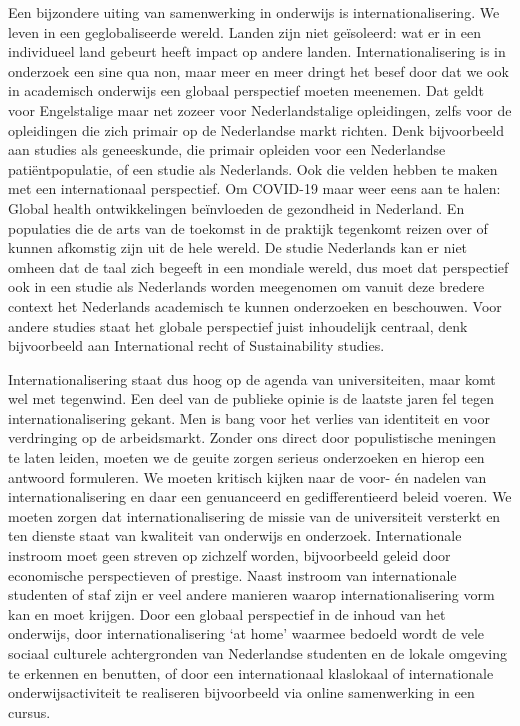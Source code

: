 \documentclass{jote-book}
\begin{document}
	Een bijzondere uiting van samenwerking in onderwijs is internationalisering. We leven in een geglobaliseerde wereld. Landen zijn niet geïsoleerd: wat er in een individueel land gebeurt heeft impact op andere landen. Internationalisering is in onderzoek een sine qua non, maar meer en meer dringt het besef door dat we ook in academisch onderwijs een globaal perspectief moeten meenemen. Dat geldt voor Engelstalige maar net zozeer voor Nederlandstalige opleidingen, zelfs voor de opleidingen die zich primair op de Nederlandse markt richten. Denk bijvoorbeeld aan studies als geneeskunde, die primair opleiden voor een Nederlandse patiëntpopulatie, of een studie als Nederlands. Ook die velden hebben te maken met een internationaal perspectief. Om COVID-19 maar weer eens aan te halen: Global health ontwikkelingen beïnvloeden de gezondheid in Nederland. En populaties die de arts van de toekomst in de praktijk tegenkomt reizen over of kunnen afkomstig zijn uit de hele wereld. De studie Nederlands kan er niet omheen dat de taal zich begeeft in een mondiale wereld, dus moet dat perspectief ook in een studie als Nederlands worden meegenomen om vanuit deze bredere context het Nederlands academisch te kunnen onderzoeken en beschouwen. Voor andere studies staat het globale perspectief juist inhoudelijk centraal, denk bijvoorbeeld aan International recht of Sustainability studies.



	Internationalisering staat dus hoog op de agenda van universiteiten, maar komt wel met tegenwind. Een deel van de publieke opinie is de laatste jaren fel tegen internationalisering gekant. Men is bang voor het verlies van identiteit en voor verdringing op de arbeidsmarkt. Zonder ons direct door populistische meningen te laten leiden, moeten we de geuite zorgen serieus onderzoeken en hierop een antwoord formuleren. We moeten kritisch kijken naar de voor- én nadelen van internationalisering en daar een genuanceerd en gedifferentieerd beleid voeren. We moeten zorgen dat internationalisering de missie van de universiteit versterkt en ten dienste staat van kwaliteit van onderwijs en onderzoek. Internationale instroom moet geen streven op zichzelf worden, bijvoorbeeld geleid door economische perspectieven of prestige. Naast instroom van internationale studenten of staf zijn er veel andere manieren waarop internationalisering vorm kan en moet krijgen. Door een globaal perspectief in de inhoud van het onderwijs, door internationalisering ‘at home' waarmee bedoeld wordt de vele sociaal culturele achtergronden van Nederlandse studenten en de lokale omgeving te erkennen en benutten, of door een internationaal klaslokaal of internationale onderwijsactiviteit te realiseren bijvoorbeeld via online samenwerking in een cursus.
\end{document}
